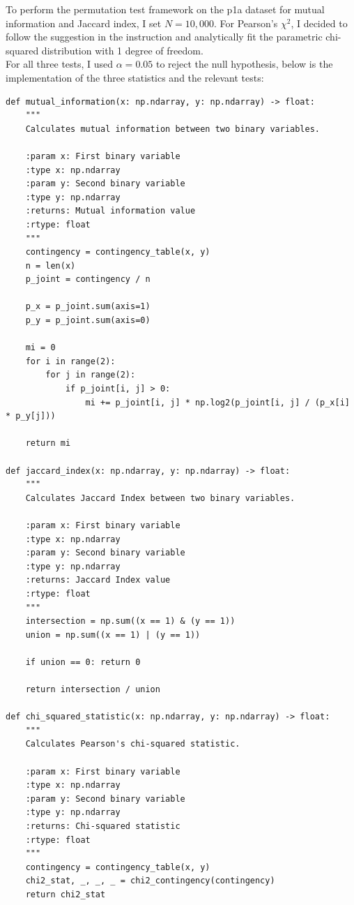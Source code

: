 To perform the permutation test framework on the p1a dataset for mutual information and Jaccard index, I set $ N = 10,000 $. For Pearson's $ \chi^2 $, I decided to follow the suggestion in the instruction and analytically fit the parametric chi-squared distribution with 1 degree of freedom.\\

For all three tests, I used $ \alpha = 0.05 $ to reject the null hypothesis, below is the implementation of the three statistics and the relevant tests:

\begin{verbatim}
def mutual_information(x: np.ndarray, y: np.ndarray) -> float:
    """
    Calculates mutual information between two binary variables.
    
    :param x: First binary variable
    :type x: np.ndarray
    :param y: Second binary variable
    :type y: np.ndarray
    :returns: Mutual information value
    :rtype: float
    """
    contingency = contingency_table(x, y)
    n = len(x)
    p_joint = contingency / n
    
    p_x = p_joint.sum(axis=1)
    p_y = p_joint.sum(axis=0)
    
    mi = 0
    for i in range(2):
        for j in range(2):
            if p_joint[i, j] > 0:
                mi += p_joint[i, j] * np.log2(p_joint[i, j] / (p_x[i] * p_y[j]))
    
    return mi

def jaccard_index(x: np.ndarray, y: np.ndarray) -> float:
    """
    Calculates Jaccard Index between two binary variables.
    
    :param x: First binary variable
    :type x: np.ndarray
    :param y: Second binary variable
    :type y: np.ndarray
    :returns: Jaccard Index value
    :rtype: float
    """
    intersection = np.sum((x == 1) & (y == 1))
    union = np.sum((x == 1) | (y == 1))
    
    if union == 0: return 0
    
    return intersection / union

def chi_squared_statistic(x: np.ndarray, y: np.ndarray) -> float:
    """
    Calculates Pearson's chi-squared statistic.
    
    :param x: First binary variable
    :type x: np.ndarray
    :param y: Second binary variable
    :type y: np.ndarray
    :returns: Chi-squared statistic
    :rtype: float
    """
    contingency = contingency_table(x, y)
    chi2_stat, _, _, _ = chi2_contingency(contingency)
    return chi2_stat


\end{verbatim}
